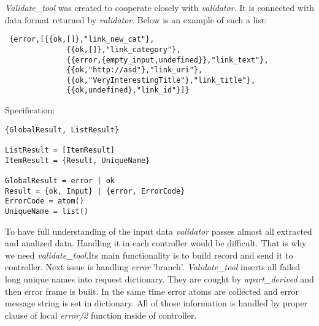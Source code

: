 \emph{Validate\_tool} was created to cooperate closely with
\emph{validator}. It is connected with data format returned by
\emph{validator}. Below is an example of such a list:\\
\begin{Verbatim}
 {error,[{{ok,[]},"link_new_cat"},
              {{ok,[]},"link_category"},
              {{error,{empty_input,undefined}},"link_text"},
              {{ok,"http://asd"},"link_uri"},
              {{ok,"VeryInterestingTitle"},"link_title"},
              {{ok,undefined},"link_id"}]}
\end{Verbatim}
Specification:
\begin{Verbatim}
{GlobalResult, ListResult}

ListResult = [ItemResult]
ItemResult = {Result, UniqueName}

GlobalResult = error | ok
Result = {ok, Input} | {error, ErrorCode}
ErrorCode = atom()
UniqueName = list()
\end{Verbatim}
To have full understanding of the input data \emph{validator} passes almost all
extracted and analized data. Handling it in each controller would be difficult.
That is why we need \emph{validate\_tool}.Its main functionality is to build
record and send it to controller. Next issue is handling
\emph{error} 'branch'. \emph{Validate\_tool} inserts all failed long unique names into request dictionary.
They are cought by \emph{wpart\_derived} and then error
frame is built. In the same time error atoms are collected and error message
string is set in dictionary. All of those information is handled by proper clause
of local \emph{error/2} function inside of controller.

